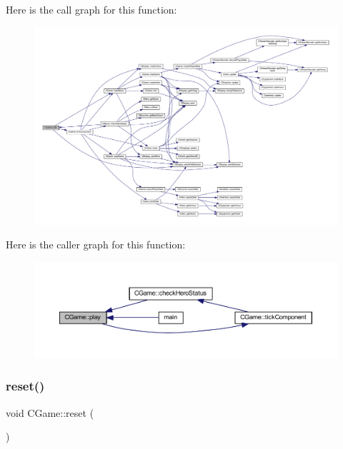 Here is the call graph for this function\+:\nopagebreak
\begin{figure}[H]
\begin{center}
\leavevmode
\includegraphics[width=350pt]{class_c_game_aa9d3da2fefa1c04faefc6586dbd37971_cgraph}
\end{center}
\end{figure}
Here is the caller graph for this function\+:\nopagebreak
\begin{figure}[H]
\begin{center}
\leavevmode
\includegraphics[width=350pt]{class_c_game_aa9d3da2fefa1c04faefc6586dbd37971_icgraph}
\end{center}
\end{figure}
\mbox{\label{class_c_game_acdb5a10d8b17584b07b3c736ede7bf57}} 
\subsubsection{\texorpdfstring{reset()}{reset()}}
{\footnotesize\ttfamily void C\+Game\+::reset (\begin{DoxyParamCaption}{ }\end{DoxyParamCaption})\hspace{0.3cm}{\ttfamily [protected]}}


